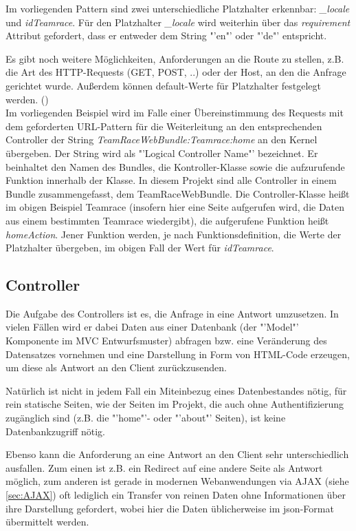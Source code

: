 \documentclass[12pt]{report}
\begin{document}
Im vorliegenden Pattern sind zwei unterschiedliche Platzhalter erkennbar: \emph{\_locale} und \emph{idTeamrace}. Für den Platzhalter \emph{\_locale} wird weiterhin über das \emph{requirement} Attribut gefordert, dass er entweder dem String "'en"' oder "'de"' entspricht.

Es gibt noch weitere Möglichkeiten, Anforderungen an die Route zu stellen, z.B. die Art des HTTP-Requests (GET, POST, ..) oder der Host, an den die Anfrage gerichtet wurde. Außerdem können default-Werte für Platzhalter festgelegt werden. (\cite{sf2:Routing})\\

Im vorliegenden Beispiel wird im Falle einer Übereinstimmung des Requests mit dem geforderten URL-Pattern für die Weiterleitung an den entsprechenden Controller der String \emph{TeamRaceWebBundle:Teamrace:home} an den Kernel übergeben. Der String wird als "'Logical Controller Name"' bezeichnet. Er beinhaltet den Namen des Bundles, die Kontroller-Klasse sowie die aufzurufende Funktion innerhalb der Klasse. In diesem Projekt sind alle Controller in einem Bundle zusammengefasst, dem TeamRaceWebBundle. Die Controller-Klasse heißt im obigen Beispiel Teamrace (insofern hier eine Seite aufgerufen wird, die Daten aus einem bestimmten Teamrace wiedergibt), die aufgerufene Funktion heißt \emph{homeAction}. Jener Funktion werden, je nach Funktionsdefinition, die Werte der Platzhalter übergeben, im obigen Fall der Wert für \emph{idTeamrace}.

\subsection{Controller}
Die Aufgabe des Controllers ist es, die Anfrage in eine Antwort umzusetzen. In vielen Fällen wird er dabei Daten aus einer Datenbank (der "'Model"' Komponente im MVC Entwurfsmuster) abfragen bzw. eine Veränderung des Datensatzes vornehmen und eine Darstellung in Form von HTML-Code erzeugen, um diese als Antwort an den Client zurückzusenden.

Natürlich ist nicht in jedem Fall ein Miteinbezug eines Datenbestandes nötig, für rein statische Seiten, wie der Seiten im Projekt, die auch ohne Authentifizierung zugänglich sind (z.B. die "'home"'- oder "'about"' Seiten), ist keine Datenbankzugriff nötig.

Ebenso kann die Anforderung an eine Antwort an den Client sehr unterschiedlich ausfallen. Zum einen ist z.B. ein Redirect auf eine andere Seite als Antwort möglich, zum anderen ist gerade in modernen Webanwendungen via AJAX (siehe \ref{sec:AJAX}) oft lediglich ein Transfer von reinen Daten ohne Informationen über ihre Darstellung gefordert, wobei hier die Daten üblicherweise im json-Format übermittelt werden.\\
\end{document}
